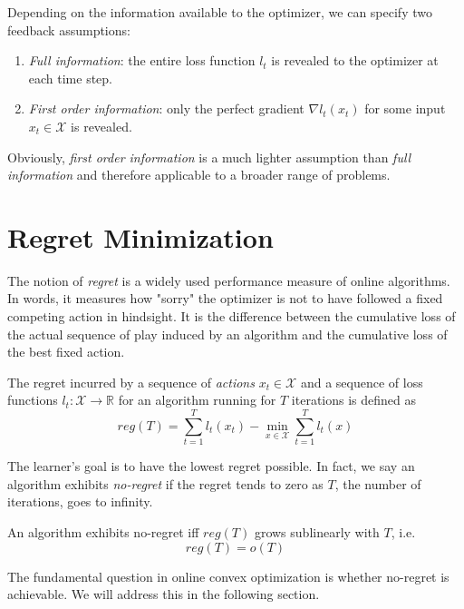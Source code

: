Depending on the information available to the optimizer, we can specify two feedback assumptions:

\begin{enumerate}
    \item \textit{Full information}: the entire loss function $l_t$ is revealed to the optimizer at each time step.
    \item \textit{First order information}: only the perfect gradient $\nabla l_t(x_t)$ for some input $x_t \in \mathcal{X}$ is revealed. 
\end{enumerate}

Obviously, \textit{first order information} is a much lighter assumption than \textit{full information} and therefore applicable to a broader range of problems. 


\section{Regret Minimization}\label{section:regretMinimization}

The notion of \textit{regret} is a widely used performance measure of online algorithms. In words, it measures how "sorry" the optimizer is not to have followed
a fixed competing action in hindsight. It is the difference between the cumulative loss
of the actual sequence of play induced by an algorithm and the cumulative loss of the best fixed action.

\begin{definition}\label{def:regret}
    The regret incurred by a sequence of \textit{actions} $x_t \in \mathcal{X}$ and a sequence of loss functions $l_t:\mathcal{X} \to\mathbb{R}$ for an algorithm running for $T$ iterations is defined as
    \[reg(T) = \sum_{t=1}^T l_t(x_t) - \min_{x \in \mathcal{X}} \sum_{t=1}^T l_t(x)\]
\end{definition}

The learner's goal is to have the lowest regret possible. In fact, we say an algorithm exhibits \textit{no-regret} if the regret tends to zero as $T$, the number of iterations, goes to infinity.

\begin{definition}\label{def:noRegret}
    An algorithm exhibits no-regret iff $reg(T)$ grows sublinearly  with $T$, i.e.
    \[reg(T) = o(T)\]
\end{definition}

The fundamental question in online convex optimization is whether no-regret is achievable. We will address this in the following section. 

